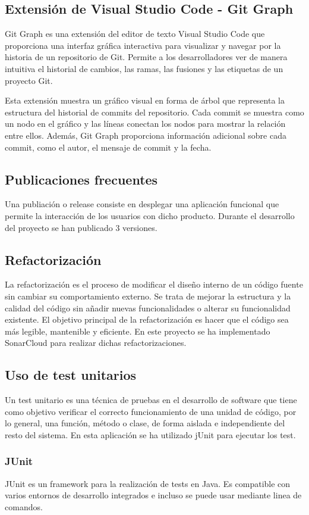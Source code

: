 \subsection{Extensión de Visual Studio Code - Git Graph}
Git Graph es una extensión del editor de texto Visual Studio Code que proporciona una interfaz gráfica interactiva para visualizar y navegar por la historia de un repositorio de Git. Permite a los desarrolladores ver de manera intuitiva el historial de cambios, las ramas, las fusiones y las etiquetas de un proyecto Git.

Esta extensión muestra un gráfico visual en forma de árbol que representa la estructura del historial de commits del repositorio. Cada commit se muestra como un nodo en el gráfico y las líneas conectan los nodos para mostrar la relación entre ellos. Además, Git Graph proporciona información adicional sobre cada commit, como el autor, el mensaje de commit y la fecha.
\subsection{Publicaciones frecuentes}
Una publiación o release consiste en desplegar una aplicación funcional que permite la interacción de los usuarios con dicho producto. Durante el desarrollo del proyecto se han publicado 3 versiones.
\subsection{Refactorización}
La refactorización es el proceso de modificar el diseño interno de un código fuente sin cambiar su comportamiento externo. Se trata de mejorar la estructura y la calidad del código sin añadir nuevas funcionalidades o alterar su funcionalidad existente. El objetivo principal de la refactorización es hacer que el código sea más legible, mantenible y eficiente. En este proyecto se ha implementado SonarCloud para realizar dichas refactorizaciones.
\subsection{Uso de test unitarios}
Un test unitario es una técnica de pruebas en el desarrollo de software que tiene como objetivo verificar el correcto funcionamiento de una unidad de código, por lo general, una función, método o clase, de forma aislada e independiente del resto del sistema. En esta aplicación se ha utilizado jUnit para ejecutar los test.
\subsubsection{JUnit}
JUnit es un framework para la realización de tests en Java. Es compatible con varios entornos de desarrollo integrados e incluso se puede usar mediante linea de comandos.
